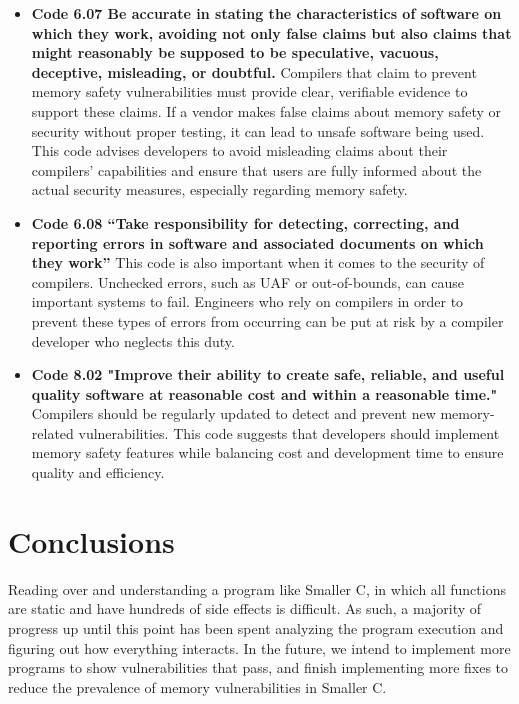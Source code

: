 \documentclass[sigconf, anonymous]{acmart}
\begin{document}
\begin{itemize}
\item \textbf{Code 6.07 Be accurate in stating the characteristics of software on which they work, avoiding not only false claims but also claims that might reasonably be supposed to be speculative, vacuous, deceptive, misleading, or doubtful.} Compilers that claim to prevent memory safety vulnerabilities must provide clear, verifiable evidence to support these claims. If a vendor makes false claims about memory safety or security without proper testing, it can lead to unsafe software being used. This code advises developers to avoid misleading claims about their compilers' capabilities and ensure that users are fully informed about the actual security measures, especially regarding memory safety. 

\item \textbf{Code 6.08 “Take responsibility for detecting, correcting, and reporting errors in software and associated documents on which they work”} This code is also important when it comes to the security of compilers. Unchecked errors, such as UAF or out-of-bounds, can cause important systems to fail. Engineers who rely on compilers in order to prevent these types of errors from occurring can be put at risk by a compiler developer who neglects this duty.

\item \textbf{Code 8.02 "Improve their ability to create safe, reliable, and useful quality software at reasonable cost and within a reasonable time."}
Compilers should be regularly updated to detect and prevent new memory-related vulnerabilities. This code suggests that developers should implement memory safety features while balancing cost and development time to ensure quality and efficiency.

\end{itemize}

\section{Conclusions}
\label{conclusions}

Reading over and understanding a program like Smaller C, in which all functions are static and have hundreds of side effects is difficult. As such, a majority of progress up until this point has been spent analyzing the program execution and figuring out how everything interacts. In the future, we intend to implement more programs to show vulnerabilities that pass, and finish implementing more fixes to reduce the prevalence of memory vulnerabilities in Smaller C. 
\end{document}

